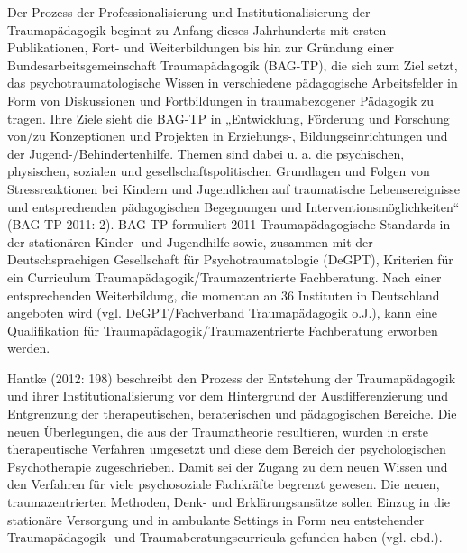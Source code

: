Der Prozess der Professionalisierung und Institutionalisierung der Traumapädagogik beginnt zu Anfang dieses Jahrhunderts mit ersten Publikationen, Fort- und Weiterbildungen bis hin zur Gründung einer Bundesarbeitsgemeinschaft Traumapädagogik (BAG-TP), die sich zum Ziel setzt, das psychotraumatologische Wissen in verschiedene pädagogische Arbeitsfelder in Form von Diskussionen und Fortbildungen in traumabezogener Pädagogik zu tragen. Ihre Ziele sieht die BAG-TP in „Entwicklung, Förderung und Forschung von/zu Konzeptionen und Projekten in Erziehungs-, Bildungseinrichtungen und der Jugend-/Behindertenhilfe. Themen sind dabei u. a. die psychischen, physischen, sozialen und gesellschaftspolitischen Grundlagen und Folgen von Stressreaktionen bei Kindern und Jugendlichen auf traumatische Lebensereignisse und entsprechenden pädagogischen Begegnungen und Interventionsmöglichkeiten“ (BAG-TP 2011: 2). BAG-TP formuliert 2011 Traumapädagogische Standards in der stationären Kinder- und Jugendhilfe sowie, zusammen mit der Deutschsprachigen Gesellschaft für Psychotraumatologie (DeGPT), Kriterien für ein Curriculum Traumapädagogik/Traumazentrierte Fachberatung. Nach einer entsprechenden Weiterbildung, die momentan an 36 Instituten in Deutschland angeboten wird (vgl. DeGPT/Fachverband Traumapädagogik o.J.), kann eine Qualifikation für Traumapädagogik/Traumazentrierte Fachberatung erworben werden.

Hantke (2012: 198) beschreibt den Prozess der Entstehung der Traumapädagogik und ihrer Institutionalisierung vor dem Hintergrund der Ausdifferenzierung und Entgrenzung der therapeutischen, beraterischen und pädagogischen Bereiche. Die neuen Überlegungen, die aus der Traumatheorie resultieren, wurden in erste therapeutische Verfahren umgesetzt und diese dem Bereich der psychologischen Psychotherapie zugeschrieben. Damit sei der Zugang zu dem neuen Wissen und den Verfahren für viele psychosoziale Fachkräfte begrenzt gewesen. Die neuen, traumazentrierten Methoden, Denk- und Erklärungsansätze sollen Einzug in die stationäre Versorgung und in ambulante Settings in Form neu entstehender Traumapädagogik- und Traumaberatungscurricula gefunden haben (vgl. ebd.).
